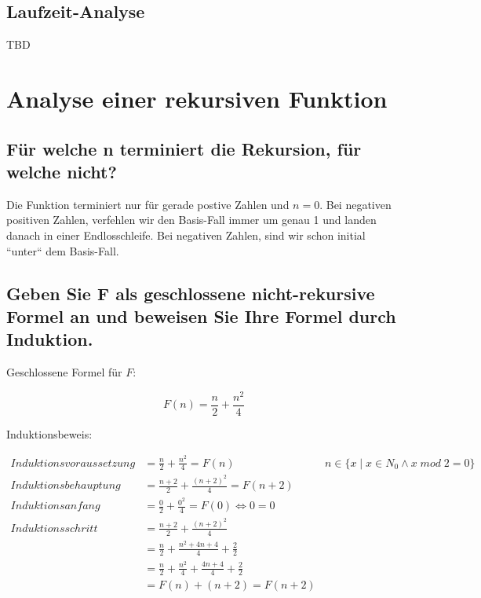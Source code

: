 \documentclass{article}
\begin{document}
\newpage

\subsection{Laufzeit-Analyse}

TBD

\newpage


\section{Analyse einer rekursiven Funktion}

\subsection{Für welche n terminiert die Rekursion, für welche nicht?}

Die Funktion terminiert nur für gerade postive Zahlen und $n = 0$. Bei negativen positiven Zahlen, verfehlen wir den
Basis-Fall immer um genau 1 und landen danach in einer Endlosschleife. Bei negativen Zahlen, sind wir schon initial
``unter`` dem Basis-Fall.

\subsection{Geben Sie F als geschlossene nicht-rekursive Formel an und beweisen Sie Ihre Formel durch Induktion.}

Geschlossene Formel für $F$:

$$F(n) = \frac{n}{2} + \frac{n^2}{4}$$

\vspace{1em}

\begin{flushleft}
	Induktionsbeweis:
\end{flushleft}

\begin{align*}
	Induktionsvoraussetzung & = \frac{n}{2} + \frac{n^2}{4} = F(n)                           & n \in \{ x \mid x \in N_0 \wedge x \; mod \; 2 = 0 \} \\
	Induktionsbehauptung    & = \frac{n + 2}{2} + \frac{(n + 2)^2}{4} = F(n + 2)                                                                     \\
	Induktionsanfang        & = \frac{0}{2} + \frac{0^2}{4} = F(0) \Leftrightarrow 0 = 0                                                             \\
	Induktionsschritt       & = \frac{n + 2}{2} + \frac{(n + 2)^2}{4}                                                                                \\
	                        & = \frac{n}{2} + \frac{n^2 + 4n + 4}{4} + \frac{2}{2}                                                                   \\
	                        & = \frac{n}{2} + \frac{n^2}{4} + \frac{4n + 4}{4} + \frac{2}{2}                                                         \\
	                        & = F(n) + (n + 2) = F(n + 2)                                                                                            \\
\end{align*}
\end{document}
